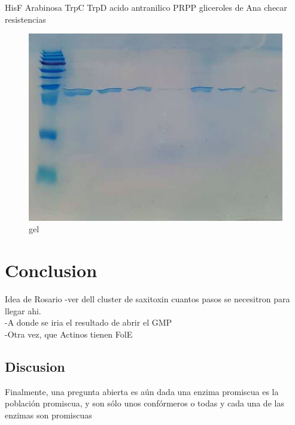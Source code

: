 \documentclass[12pt,twoside]{reedthesis}
\begin{document}
  HisF Arabinosa TrpC TrpD acido antranilico PRPP gliceroles de Ana checar
  resistencias
  
  \begin{figure}[h!tbp]
  \centering
  \includegraphics[angle = 0,scale = 0.6]{chapter4/Geles/PriAAbril30.png}
  \caption[gel]{\normalsize{gel}}
  \label{fig:gel}
  \end{figure}
  
  \begin{Shaded}
  \begin{Highlighting}[]
  \end{Highlighting}
  \end{Shaded}
  
  \chapter*{Conclusion}\label{conclusion}
  
  \setcounter{chapter}{4} \setcounter{section}{0}
  
  Idea de Rosario -ver dell cluster de saxitoxin cuantos pasos se
  necesitron para llegar ahi.\\
  -A donde se iria el resultado de abrir el GMP\\
  -Otra vez, que Actinos tienen FolE
  
  \section{Discusion}\label{discusion-1}
  
  Finalmente, una pregunta abierta es aún dada una enzima promiscua es la
  población promiscua, y son sólo unos confórmeros o todas y cada una de
  las enzimas son promiscuas
  
\end{document}

